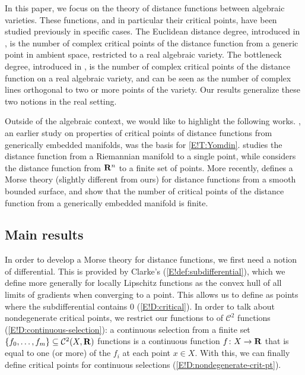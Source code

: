 In this paper, we focus on the theory of distance functions between algebraic varieties. These functions, and in particular their critical points, have been studied previously in specific cases. The Euclidean distance degree, introduced in \cite{DHOST2016}, is the number of complex critical points of the distance function from a generic point in ambient space, restricted to a real algebraic variety. The bottleneck degree, introduced in \cite{DREW2020}, is the number of complex critical points of the distance function on a real algebraic variety, and can be seen as the number of complex lines orthogonal to two or more points of the variety. Our results generalize these two notions in the real setting.

Outside of the algebraic context, we would like to highlight the following works. \cite{Yomdin1981}, an earlier study on properties of critical points of distance functions from generically embedded manifolds, was the basis for \cref{E!T:Yomdin}. \cite{cheeger} studies the distance function from a Riemannian manifold to a single point, while \cite{bobrowski2014distance} considers the distance function from $\mathbf{R}^n$ to a finite set of points. More recently, \cite{SYM2025} defines a Morse theory (slightly different from ours) for distance functions from a smooth bounded surface, and \cite{ACSD2023} show that the number of critical points of the distance function from a generically embedded manifold is finite.

\subsection{Main results}

In order to develop a Morse theory for distance functions, we first need a notion of differential. This is provided by Clarke's  (\cref{E!def:subdifferential}), which we define more generally for locally Lipschitz functions as the convex hull of all limits of gradients when converging to a point. This allows us to define  as points where the subdifferential contains $0$ (\cref{E!D:critical}). In order to talk about nondegenerate critical points, we restrict our functions to  of $\mathcal{C}^2$ functions (\cref{E!D:continuous-selection}): a continuous selection from a finite set $\{f_0, \ldots, f_m\} \subseteq \mathcal{C}^2(X, \mathbf{R})$ functions is a continuous function $f \colon X \to \mathbf{R}$ that is equal to one (or more) of the $f_i$ at each point $x \in X$. With this, we can finally define  critical points for continuous selections (\cref{E!D:nondegenerate-crit-pt}).


